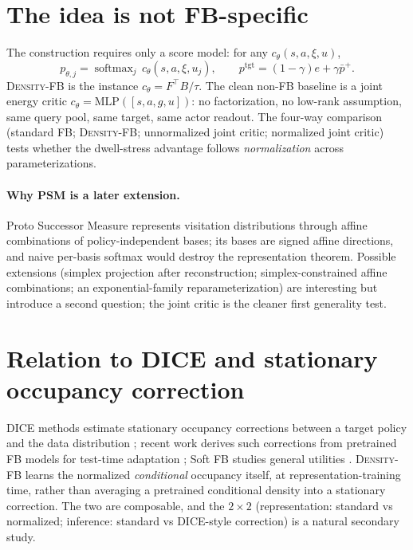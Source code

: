 \documentclass{article}
\newcommand{\DensityFB}{\textsc{Density-FB}}
\begin{document}
\section{The idea is not FB-specific}
\label{sec:generality}

The construction requires only a score model: for any $c_\theta(s,a,\xi,u)$,
\begin{equation}
p_{\theta,j} = \operatorname{softmax}_j\, c_\theta(s,a,\xi,u_j),
\qquad
p^{\mathrm{tgt}} = (1-\gamma)e + \gamma \bar p^{+}.
\end{equation}
\DensityFB{} is the instance $c_\theta = F^\top B/\tau$.
The clean non-FB baseline is a joint energy critic $c_\theta = \mathrm{MLP}([s,a,g,u])$: no factorization, no low-rank assumption, same query pool, same target, same actor readout.
The four-way comparison (standard FB; \DensityFB{}; unnormalized joint critic; normalized joint critic) tests whether the dwell-stress advantage follows \emph{normalization} across parameterizations.

\paragraph{Why PSM is a later extension.}
Proto Successor Measure \citep{agarwal-rlj25a} represents visitation distributions through affine combinations of policy-independent bases; its bases are signed affine directions, and naive per-basis softmax would destroy the representation theorem.
Possible extensions (simplex projection after reconstruction; simplex-constrained affine combinations; an exponential-family reparameterization) are interesting but introduce a second question; the joint critic is the cleaner first generality test.

\section{Relation to DICE and stationary occupancy correction}
\label{sec:dice}

DICE methods estimate stationary occupancy corrections between a target policy and the data distribution \citep{nachum2019dualdice}; recent work derives such corrections from pretrained FB models for test-time adaptation \citep{asadulaev2026zol}; Soft FB studies general utilities \citep{bagatella2026softfb}.
\DensityFB{} learns the normalized \emph{conditional} occupancy itself, at representation-training time, rather than averaging a pretrained conditional density into a stationary correction.
The two are composable, and the $2\times2$ (representation: standard vs normalized; inference: standard vs DICE-style correction) is a natural secondary study.
\end{document}

